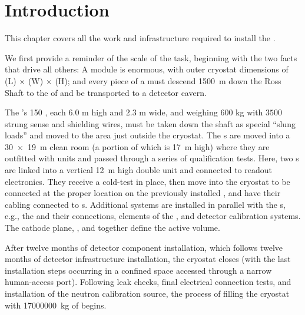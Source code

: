 
\section{Introduction}
\label{ch:sp-install-intro}

This chapter covers all the work and infrastructure required to install the . 
 
We first provide a reminder of the scale of the task, beginning with the two facts that drive all others: A   module is enormous, with outer cryostat dimensions  of 
\cryostatlen{}(L) $\times$ \cryostatwdth{}(W) $\times$ \cryostatht{}(H); 
and every piece of a  must descend 
\SI{1500}{m} down the Ross Shaft to the  of  and be transported to a detector cavern.


The 's 150 , each $6.0$ m high and $2.3$ m wide, and  weighing $600$ kg with $3500$ strung sense and shielding wires, must be taken down the shaft as special ``slung loads'' and moved to the area just outside the  cryostat. 
The s are moved into a \SI{30x19}{\meter} clean room (a portion of which is \SI{17}{m} high) where they are outfitted  with  units and passed through a series of qualification tests.
Here, two s are linked into a vertical \SI{12}{m} high double unit and connected to readout electronics. 
They receive a cold-test in place, then move into the cryostat to be connected at the proper location on the previously installed , and have their cabling connected to \fdth{}s. 
Additional systems are installed in parallel with the s, e.g., the  and their  connections, elements of the , and detector calibration systems. The cathode plane, , and  together define the  active volume. 

After twelve months of detector component installation, which follows twelve months of detector infrastructure installation, the cryostat closes (with the last installation steps occurring in a confined space accessed through a narrow human-access port). 
Following leak checks, final electrical connection tests, and installation of the neutron calibration source, the process of filling the cryostat with \SI{17000000}{\kilo\gram} of  begins.

